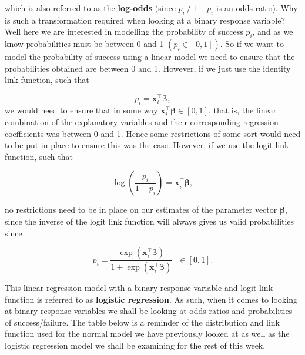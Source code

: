 \documentclass[
  letterpaper,
  DIV=11,
  numbers=noendperiod]{scrartcl}
\begin{document}
which is also referred to as the \textbf{log-odds} (since
\(p_i ~ / ~ 1-p_i\) is an odds ratio). Why is such a transformation
required when looking at a binary response variable? Well here we are
interested in modelling the probability of success \(p_i\), and as we
know probabilities must be between 0 and 1
\(\left(p_i \in [0, 1]\right)\). So if we want to model the probability
of success using a linear model we need to ensure that the probabilities
obtained are between 0 and 1. However, if we just use the identity link
function, such that

\[p_i = \mathbf{x}_i^\top \boldsymbol{\beta},\] we would need to ensure
that in some way \(\mathbf{x}_i^\top \boldsymbol{\beta} \in [0, 1]\),
that is, the linear combination of the explanatory variables and their
corresponding regression coefficients was between 0 and 1. Hence some
restrictions of some sort would need to be put in place to ensure this
was the case. However, if we use the logit link function, such that

\[\log \left(\frac{p_i}{1 - p_i} \right) = \mathbf{x}_i^\top \boldsymbol{\beta},\]

no restrictions need to be in place on our estimates of the parameter
vector \(\boldsymbol{\beta}\), since the inverse of the logit link
function will always gives us valid probabilities since

\[p_i = \frac{\exp\left(\mathbf{x}_i^\top \boldsymbol{\beta}\right)}{1 + \exp\left(\mathbf{x}_i^\top \boldsymbol{\beta}\right)} ~~~ \in [0, 1].\]

This linear regression model with a binary response variable and logit
link function is referred to as \textbf{logistic regression}. As such,
when it comes to looking at binary response variables we shall be
looking at odds ratios and probabilities of success/failure. The table
below is a reminder of the distribution and link function used for the
normal model we have previously looked at as well as the logistic
regression model we shall be examining for the rest of this week.
\end{document}
